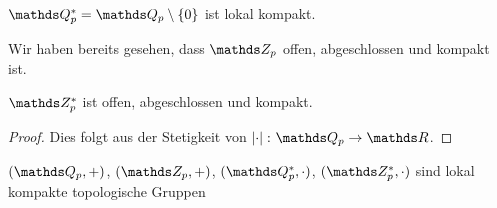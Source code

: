\begin{prop}
$\Q_p^\ast=\Q_p \setminus \{0\}$ ist lokal kompakt.
\end{prop}
Wir haben bereits gesehen, dass $\Z_p$ offen, abgeschlossen und kompakt ist.
\begin{prop}
$\Z_p^\ast$ ist offen, abgeschlossen und kompakt.
\end{prop}
\begin{proof}
Dies folgt aus der Stetigkeit von $\abs{\cdot} \colon \Q_p \to \R$.
\end{proof}

\begin{prop}
$(\Q_p,+)$, $(\Z_p,+)$, $(\Q_p^\ast,\cdot)$, $(\Z_p^\ast,\cdot)$
sind lokal kompakte topologische Gruppen
\end{prop}